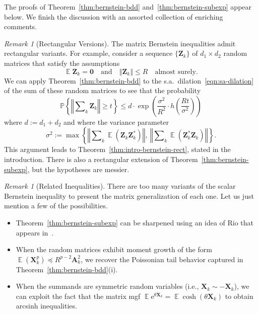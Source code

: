 \documentclass[11pt,letterpaper,twoside,reqno,draft]{amsart}
\theoremstyle{remark}
\newtheorem{rem}[thm]{Remark}
\numberwithin{equation}{section}
\numberwithin{thm}{section}
\begin{document}
The proofs of Theorem~\ref{thm:bernstein-bdd} and~\ref{thm:bernstein-subexp} appear below.  We finish the discussion with an assorted collection of enriching comments.

\begin{rem}[Rectangular Versions] \label{rem:rect-bernstein}
The matrix Bernstein inequalities admit rectangular variants.  For example, consider a sequence $\{{\bm{{Z}}}_k\}$ of $d_1 \times d_2$ random matrices that satisfy the assumptions
$$
{\operatorname{\mathbb{E}}} {\bm{{Z}}}_k = {\bm{{0}}}
\quad\text{and}\quad
{\left\Vert {{ {\bm{{Z}}}_k }} \right\Vert} \leq R \quad\text{almost surely}.
$$
We can apply Theorem~\ref{thm:bernstein-bdd} to the s.a.~dilation~\eqref{eqn:sa-dilation} of the sum of these random matrices to see that the probability
$$
{\mathbb{P}\left\{ {{ {\left\Vert {{ \sum\nolimits_k {\bm{{Z}}}_k }} \right\Vert} \geq t }} \right\}}
	\leq d \cdot \exp\left( \frac{\sigma^2}{R^2} \cdot h\!\left( \frac{Rt}{\sigma^2} \right) \right)
$$
where $d := d_1 + d_2$ and where the variance parameter
$$
\sigma^2 := \max\left\{ {\left\Vert {{\sum\nolimits_k {\operatorname{\mathbb{E}}}({\bm{{Z}}}_k{\bm{{Z}}}_k^{*})}} \right\Vert}, \
	{\left\Vert {{ \sum\nolimits_k {\operatorname{\mathbb{E}}}( {\bm{{Z}}}_k^{*} {\bm{{Z}}}_k ) }} \right\Vert} \right\}.
$$
This argument leads to Theorem~\ref{thm:intro-bernstein-rect}, stated in the introduction.  There is also a rectangular extension of Theorem~\ref{thm:bernstein-subexp}, but the hypotheses are messier.
\end{rem}

\begin{rem}[Related Inequalities] 
There are too many variants of the scalar Bernstein inequality to present the matrix generalization of each one.  Let us just mention a few of the possibilities.

\begin{itemize}
\item	Theorem~\ref{thm:bernstein-subexp} can be sharpened using an idea of Rio that appears in~\cite[Sec.~2.2.3]{Mas07:Concentration-Inequalities}.

\item	When the random matrices exhibit moment growth of the form ${\operatorname{\mathbb{E}}}( {\bm{{X}}}_k^p ) {\preccurlyeq} R^{p-2} {\bm{{A}}}_k^2$, we recover the Poissonian tail behavior captured in Theorem~\ref{thm:bernstein-bdd}(i).

\item	When the summands are symmetric random variables (i.e., ${\bm{{X}}}_k \sim - {\bm{{X}}}_k$), we can exploit the fact that the matrix mgf ${\operatorname{\mathbb{E}}} {\mathrm{e}}^{\theta {\bm{{X}}}_k} = {\operatorname{\mathbb{E}}} \cosh(\theta {\bm{{X}}}_k)$ to obtain arcsinh inequalities.

\end{itemize}
\end{rem}
\end{document}
